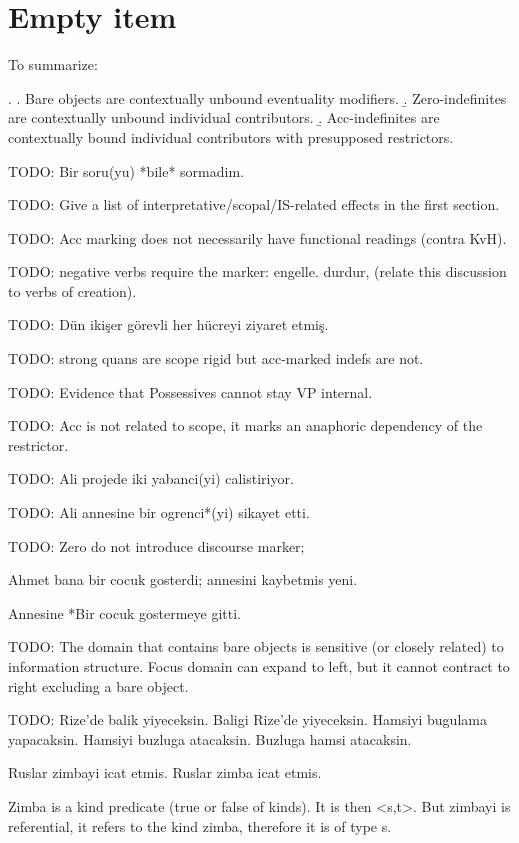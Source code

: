 \documentclass[11pt,a4paper]{article}
\begin{document}
\section{Empty item}


To summarize:

\ex.
\a. Bare objects are contextually unbound eventuality modifiers.
\b. Zero-indefinites are contextually unbound individual contributors.
\b. Acc-indefinites are contextually bound individual contributors with presupposed restrictors.






TODO: Bir soru(yu) *bile* sormadim.

TODO: Give a list of interpretative/scopal/IS-related effects in the first section.

TODO: Acc marking does not necessarily have functional readings (contra KvH).

TODO: negative verbs require the marker: engelle. durdur, (relate this discussion to verbs of creation).

TODO: Dün ikişer görevli her hücreyi ziyaret etmiş.

TODO: strong quans are scope rigid but acc-marked indefs are not.

TODO: Evidence that Possessives cannot stay VP internal.

TODO: Acc is not related to scope, it marks an anaphoric dependency of the restrictor.

TODO: Ali projede iki yabanci(yi) calistiriyor.

TODO: Ali annesine bir ogrenci*(yi) sikayet etti.

TODO: Zero do not introduce discourse marker;

Ahmet bana bir cocuk gosterdi; annesini kaybetmis yeni. 

Annesine *Bir cocuk gostermeye gitti.

TODO: The domain that contains bare objects is sensitive (or closely related) to information structure. Focus domain can expand to left, but it cannot contract to right excluding a bare object.

TODO: 
Rize'de balik yiyeceksin.
Baligi Rize'de yiyeceksin. 
Hamsiyi bugulama yapacaksin.
Hamsiyi buzluga atacaksin. 
Buzluga hamsi atacaksin.

Ruslar zimbayi icat etmis.
Ruslar zimba icat etmis.

Zimba is a kind predicate (true or false of kinds). It is then <s,t>. But zimbayi is referential, it refers to the kind zimba, therefore it is of type s.
\end{document}

